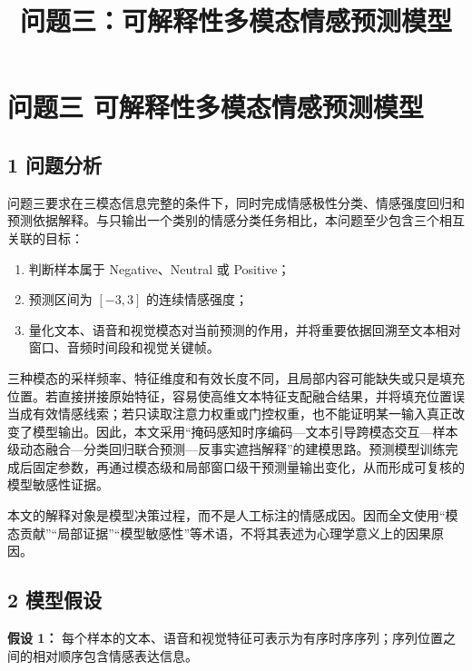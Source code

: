 \documentclass[
  12pt,
  a4paper,
]{ctexart}
\title{问题三：可解释性多模态情感预测模型}
\author{}
\date{}
\providecommand{\tightlist}{%
  \setlength{\itemsep}{0pt}\setlength{\parskip}{0pt}}
\begin{document}
\hypertarget{ux95eeux9898ux4e09-ux53efux89e3ux91caux6027ux591aux6a21ux6001ux60c5ux611fux9884ux6d4bux6a21ux578b}{%
\section{问题三
可解释性多模态情感预测模型}\label{ux95eeux9898ux4e09-ux53efux89e3ux91caux6027ux591aux6a21ux6001ux60c5ux611fux9884ux6d4bux6a21ux578b}}

\hypertarget{ux95eeux9898ux5206ux6790}{%
\subsection{1 问题分析}\label{ux95eeux9898ux5206ux6790}}

问题三要求在三模态信息完整的条件下，同时完成情感极性分类、情感强度回归和预测依据解释。与只输出一个类别的情感分类任务相比，本问题至少包含三个相互关联的目标：

\begin{enumerate}
\def\labelenumi{\arabic{enumi}.}
\tightlist
\item
  判断样本属于 Negative、Neutral 或 Positive；
\item
  预测区间为 \([-3,3]\) 的连续情感强度；
\item
  量化文本、语音和视觉模态对当前预测的作用，并将重要依据回溯至文本相对窗口、音频时间段和视觉关键帧。
\end{enumerate}

三种模态的采样频率、特征维度和有效长度不同，且局部内容可能缺失或只是填充位置。若直接拼接原始特征，容易使高维文本特征支配融合结果，并将填充位置误当成有效情感线索；若只读取注意力权重或门控权重，也不能证明某一输入真正改变了模型输出。因此，本文采用``掩码感知时序编码---文本引导跨模态交互---样本级动态融合---分类回归联合预测---反事实遮挡解释''的建模思路。预测模型训练完成后固定参数，再通过模态级和局部窗口级干预测量输出变化，从而形成可复核的模型敏感性证据。

本文的解释对象是模型决策过程，而不是人工标注的情感成因。因而全文使用``模态贡献''``局部证据''``模型敏感性''等术语，不将其表述为心理学意义上的因果原因。

\hypertarget{ux6a21ux578bux5047ux8bbe}{%
\subsection{2 模型假设}\label{ux6a21ux578bux5047ux8bbe}}

\textbf{假设 1：}
每个样本的文本、语音和视觉特征可表示为有序时序序列；序列位置之间的相对顺序包含情感表达信息。
\end{document}
